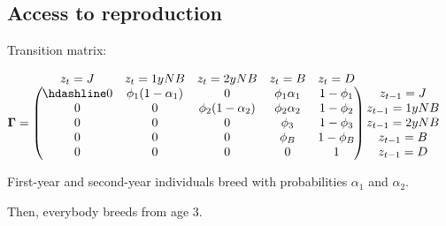 \documentclass[
  12pt,
]{krantz}
\begin{document}
\hypertarget{access-to-reproduction}{%
\subsection{Access to reproduction}\label{access-to-reproduction}}

Transition matrix:

\[
\begin{matrix}
& \\
\mathbf{\Gamma} =
    \left ( \vphantom{ \begin{matrix} 12 \\ 12 \\ 12 \\ 12 \\ 12 \end{matrix} } \right .
\end{matrix}
\hspace{-1.2em}
\begin{matrix}
    z_t=J & z_t=1yNB & z_t=2yNB & z_t=B & z_t=D \\ \hdashline
0 & \phi_1 (1-\alpha_1) & 0 & \phi_1 \alpha_1 & 1 - \phi_1\\
0 & 0 & \phi_2 (1-\alpha_2) & \phi_2 \alpha_2 & 1 - \phi_2\\
0 & 0 & 0 & \phi_3 & 1 - \phi_3\\
0 & 0 & 0 & \phi_B & 1 - \phi_B\\
0 & 0 & 0 & 0 & 1
\end{matrix}
\hspace{-0.2em}
\begin{matrix}
& \\
\left . \vphantom{ \begin{matrix} 12 \\ 12 \\ 12 \\ 12 \\ 12 \end{matrix} } \right )
    \begin{matrix}
    z_{t-1} = J \\ z_{t-1} = 1yNB \\ z_{t-1} = 2yNB \\ z_{t-1} = B \\ z_{t-1} = D
    \end{matrix}
\end{matrix}
\]

First-year and second-year individuals breed with probabilities \(\alpha_1\) and \(\alpha_2\).

Then, everybody breeds from age 3.
\end{document}
